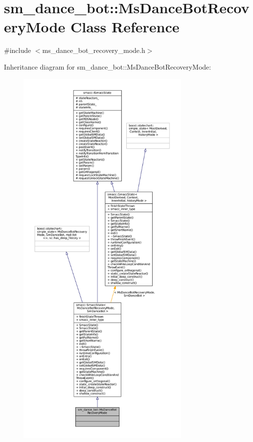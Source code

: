 \hypertarget{classsm__dance__bot_1_1MsDanceBotRecoveryMode}{}\section{sm\+\_\+dance\+\_\+bot\+:\+:Ms\+Dance\+Bot\+Recovery\+Mode Class Reference}
\label{classsm__dance__bot_1_1MsDanceBotRecoveryMode}


{\ttfamily \#include $<$ms\+\_\+dance\+\_\+bot\+\_\+recovery\+\_\+mode.\+h$>$}



Inheritance diagram for sm\+\_\+dance\+\_\+bot\+:\+:Ms\+Dance\+Bot\+Recovery\+Mode\+:
\nopagebreak
\begin{figure}[H]
\begin{center}
\leavevmode
\includegraphics[height=550pt]{classsm__dance__bot_1_1MsDanceBotRecoveryMode__inherit__graph}
\end{center}
\end{figure}


